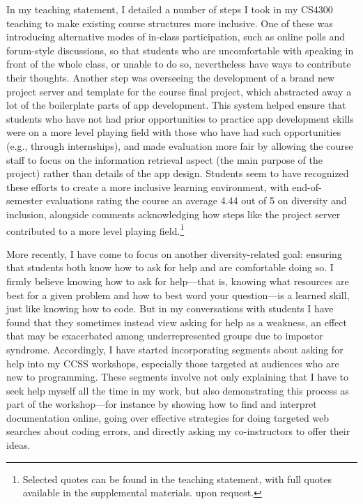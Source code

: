 \documentclass[12pt,letterpaper]{article}
\begin{document}
In my teaching statement, I detailed a number of steps I took in my CS4300 teaching to make existing course structures more inclusive.
One of these was introducing alternative modes of in-class participation, such as online polls and forum-style discussions, so that students who are uncomfortable with speaking in front of the whole class, or unable to do so, nevertheless have ways to contribute their thoughts.
Another step was overseeing the development of a brand new project server and template for the course final project, which abstracted away a lot of the boilerplate parts of app development.
This system helped ensure that students who have not had prior opportunities to practice app development skills were on a more level playing field with those who have had such opportunities (e.g., through internships), and made evaluation more fair by allowing the course staff to focus on the information retrieval aspect (the main purpose of the project) rather than details of the app design.
Students seem to have recognized these efforts to create a more inclusive learning environment, with end-of-semester evaluations rating the course an average 4.44 out of 5 on diversity and inclusion, alongside comments acknowledging how steps like the project server contributed to a more level playing field.\footnote{%
Selected quotes can be found in the teaching statement, with full quotes available
\ifsupplementals
in the supplemental materials.
\else
upon request.
\fi
}

More recently, I have come to focus on another diversity-related goal: ensuring that students both know how to ask for help and are comfortable doing so.
I firmly believe knowing how to ask for help---that is, knowing what resources are best for a given problem and how to best word your question---is a learned skill, just like knowing how to code.
But in my conversations with students I have found that they sometimes instead view asking for help as a weakness, an effect that may be exacerbated among underrepresented groups due to impostor syndrome.
Accordingly, I have started incorporating segments about asking for help into my CCSS workshops, especially those targeted at audiences who are new to programming.
These segments involve not only explaining that I have to seek help myself all the time in my work, but also demonstrating this process as part of the workshop---for instance by showing how to find and interpret documentation online, going over effective strategies for doing targeted web searches about coding errors, and directly asking my co-instructors to offer their ideas.
\end{document}
